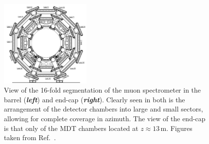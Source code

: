 \begin{figure}[!htb]
    \begin{center}
        \includegraphics[width=0.4\textwidth]{figures/chapter2/muon_spec/atlas_muon_barrel}
        \caption{
            View of the 16-fold segmentation of the muon spectrometer in the barrel (\textbf{\textit{left}})
            and end-cap (\textbf{\textit{right}}).
            Clearly seen in both is the arrangement of the detector chambers into large and
            small sectors, allowing for complete coverage in azimuth.
            The view of the end-cap is that only of the MDT chambers located at $z\approx13$\,m.
            Figures taken from Ref.~\cite{CERN-LHCC-97-022}.
        }
        \label{fig:muon_segmentation}
    \end{center}
\end{figure}

